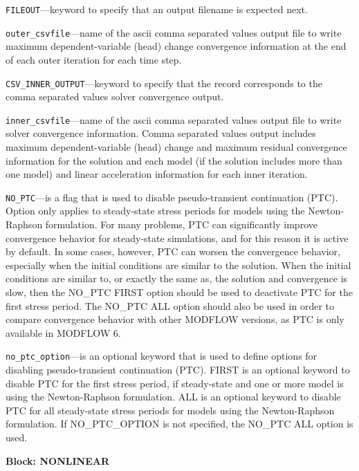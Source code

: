 \begin{description}
\item \texttt{FILEOUT}---keyword to specify that an output filename is expected next.

\item \texttt{outer\_csvfile}---name of the ascii comma separated values output file to write maximum dependent-variable (head) change convergence information at the end of each outer iteration for each time step.

\item \texttt{CSV\_INNER\_OUTPUT}---keyword to specify that the record corresponds to the comma separated values solver convergence output.

\item \texttt{inner\_csvfile}---name of the ascii comma separated values output file to write solver convergence information. Comma separated values output includes maximum dependent-variable (head) change and maximum residual convergence information for the solution and each model (if the solution includes more than one model) and linear acceleration information for each inner iteration.

\item \texttt{NO\_PTC}---is a flag that is used to disable pseudo-transient continuation (PTC). Option only applies to steady-state stress periods for models using the Newton-Raphson formulation. For many problems, PTC can significantly improve convergence behavior for steady-state simulations, and for this reason it is active by default.  In some cases, however, PTC can worsen the convergence behavior, especially when the initial conditions are similar to the solution.  When the initial conditions are similar to, or exactly the same as, the solution and convergence is slow, then the NO\_PTC FIRST option should be used to deactivate PTC for the first stress period.  The NO\_PTC ALL option should also be used in order to compare convergence behavior with other MODFLOW versions, as PTC is only available in MODFLOW 6.

\item \texttt{no\_ptc\_option}---is an optional keyword that is used to define options for disabling pseudo-transient continuation (PTC). FIRST is an optional keyword to disable PTC for the first stress period, if steady-state and one or more model is using the Newton-Raphson formulation. ALL is an optional keyword to disable PTC for all steady-state stress periods for models using the Newton-Raphson formulation. If NO\_PTC\_OPTION is not specified, the NO\_PTC ALL option is used.

\end{description}
\item \textbf{Block: NONLINEAR}

